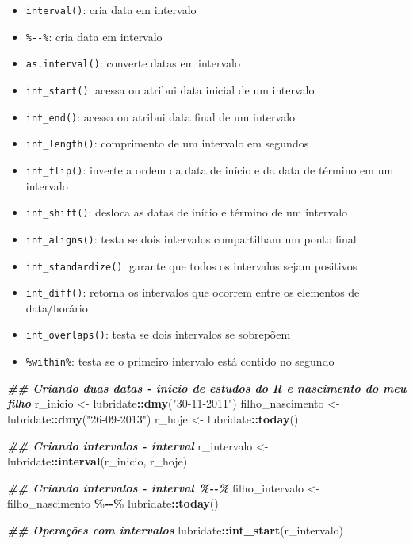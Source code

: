 \documentclass[
]{article}
\newenvironment{Shaded}{\begin{snugshade}}{\end{snugshade}}
\newcommand{\DocumentationTok}[1]{\textcolor[rgb]{0.56,0.35,0.01}{\textbf{\textit{#1}}}}
\newcommand{\FunctionTok}[1]{\textcolor[rgb]{0.13,0.29,0.53}{\textbf{#1}}}
\newcommand{\NormalTok}[1]{#1}
\newcommand{\OtherTok}[1]{\textcolor[rgb]{0.56,0.35,0.01}{#1}}
\newcommand{\SpecialCharTok}[1]{\textcolor[rgb]{0.81,0.36,0.00}{\textbf{#1}}}
\newcommand{\StringTok}[1]{\textcolor[rgb]{0.31,0.60,0.02}{#1}}
\providecommand{\tightlist}{%
  \setlength{\itemsep}{0pt}\setlength{\parskip}{0pt}}
\begin{document}
\begin{itemize}
\tightlist
\item
  \texttt{interval()}: cria data em intervalo
\item
  \texttt{\%-\/-\%}: cria data em intervalo
\item
  \texttt{as.interval()}: converte datas em intervalo
\item
  \texttt{int\_start()}: acessa ou atribui data inicial de um intervalo
\item
  \texttt{int\_end()}: acessa ou atribui data final de um intervalo
\item
  \texttt{int\_length()}: comprimento de um intervalo em segundos
\item
  \texttt{int\_flip()}: inverte a ordem da data de início e da data de término em um intervalo
\item
  \texttt{int\_shift()}: desloca as datas de início e término de um intervalo
\item
  \texttt{int\_aligns()}: testa se dois intervalos compartilham um ponto final
\item
  \texttt{int\_standardize()}: garante que todos os intervalos sejam positivos
\item
  \texttt{int\_diff()}: retorna os intervalos que ocorrem entre os elementos de data/horário
\item
  \texttt{int\_overlaps()}: testa se dois intervalos se sobrepõem
\item
  \texttt{\%within\%}: testa se o primeiro intervalo está contido no segundo
\end{itemize}

\begin{Shaded}
\begin{Highlighting}[]
\DocumentationTok{\#\# Criando duas datas {-} início de estudos do R e nascimento do meu filho}
\NormalTok{r\_inicio }\OtherTok{\textless{}{-}}\NormalTok{ lubridate}\SpecialCharTok{::}\FunctionTok{dmy}\NormalTok{(}\StringTok{"30{-}11{-}2011"}\NormalTok{)}
\NormalTok{filho\_nascimento }\OtherTok{\textless{}{-}}\NormalTok{ lubridate}\SpecialCharTok{::}\FunctionTok{dmy}\NormalTok{(}\StringTok{"26{-}09{-}2013"}\NormalTok{)}
\NormalTok{r\_hoje }\OtherTok{\textless{}{-}}\NormalTok{ lubridate}\SpecialCharTok{::}\FunctionTok{today}\NormalTok{()}

\DocumentationTok{\#\# Criando intervalos {-} interval}
\NormalTok{r\_intervalo }\OtherTok{\textless{}{-}}\NormalTok{ lubridate}\SpecialCharTok{::}\FunctionTok{interval}\NormalTok{(r\_inicio, r\_hoje)}

\DocumentationTok{\#\# Criando intervalos {-} interval \%{-}{-}\%}
\NormalTok{filho\_intervalo }\OtherTok{\textless{}{-}}\NormalTok{ filho\_nascimento }\SpecialCharTok{\%{-}{-}\%}\NormalTok{ lubridate}\SpecialCharTok{::}\FunctionTok{today}\NormalTok{()}

\DocumentationTok{\#\# Operações com intervalos}
\NormalTok{lubridate}\SpecialCharTok{::}\FunctionTok{int\_start}\NormalTok{(r\_intervalo)}
\end{Highlighting}
\end{Shaded}
\end{document}
